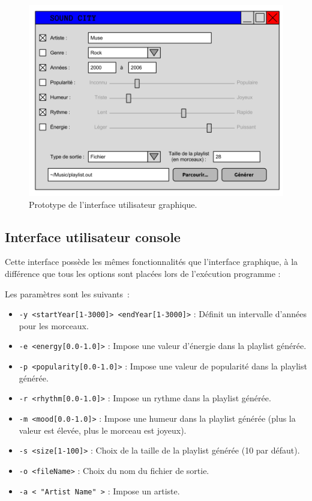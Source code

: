 \begin{figure}[H]
\includegraphics[width=\textwidth]{data/besoins/interface_utilisateur.png}
\caption{Prototype de l'interface utilisateur graphique.}
\end{figure}

\subsection{Interface utilisateur console}
\label{besoins:proto:console}

Cette interface possède les mêmes fonctionnalités que l'interface graphique, à 
la différence que tous les options sont placées lors de l'exécution programme :

\vspace{3mm}
\noindent Les paramètres sont les suivants~:
\begin{itemize}
\item \texttt{-y <startYear[1-3000]> <endYear[1-3000]>} : Définit un intervalle 
d'années pour les morceaux.
\item \texttt{-e <energy[0.0-1.0]>} : Impose une valeur d'énergie dans 
la playlist générée.
\item \texttt{-p <popularity[0.0-1.0]>} : Impose une valeur de popularité 
dans la playlist générée.
\item \texttt{-r <rhythm[0.0-1.0]>} : Impose un rythme dans la 
playlist générée.
\item \texttt{-m <mood[0.0-1.0]>} : Impose une humeur dans la 
playlist générée (plus la valeur est élevée, plus le morceau est joyeux).
\item \texttt{-s <size[1-100]>} : Choix de la taille de la 
playlist générée (10 par défaut).
\item \texttt{-o <fileName>} : Choix du nom du fichier de sortie.
\item \texttt{-a < "Artist Name" >} : Impose un artiste.
\end{itemize}
